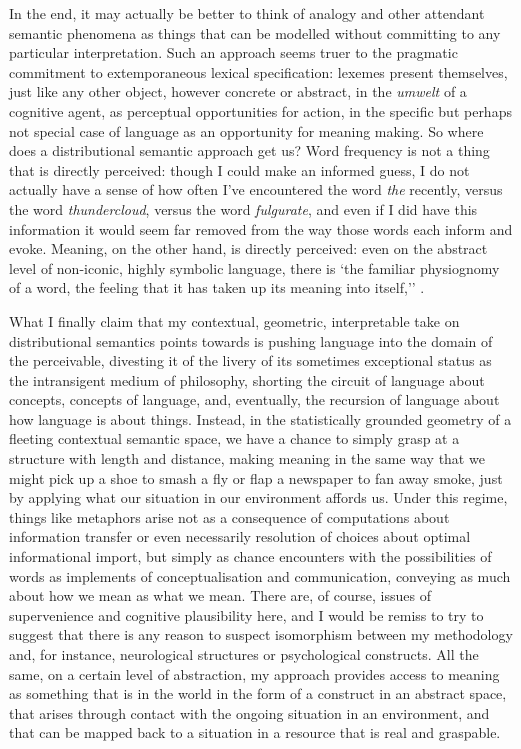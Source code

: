 In the end, it may actually be better to think of analogy and other attendant semantic phenomena as things that can be modelled without committing to any particular interpretation.  Such an approach seems truer to the pragmatic commitment to extemporaneous lexical specification: lexemes present themselves, just like any other object, however concrete or abstract, in the \emph{umwelt} of a cognitive agent, as perceptual opportunities for action, in the specific but perhaps not special case of language as an opportunity for meaning making.  So where does a distributional semantic approach get us?  Word frequency is not a thing that is directly perceived: though I could make an informed guess, I do not actually have a sense of how often I've encountered the word \emph{the} recently, versus the word \emph{thundercloud}, versus the word \emph{fulgurate}, and even if I did have this information it would seem far removed from the way those words each inform and evoke.  Meaning, on the other hand, is directly perceived: even on the abstract level of non-iconic, highly symbolic language, there is `the familiar physiognomy of a word, the feeling that it has taken up its meaning into itself,'' \citep[][p. 218]{Wittgenstein1953}.

What I finally claim that my contextual, geometric, interpretable take on distributional semantics points towards is pushing language into the domain of the perceivable, divesting it of the livery of its sometimes exceptional status as the intransigent medium of philosophy, shorting the circuit of language about concepts, concepts of language, and, eventually, the recursion of language about how language is about things.  Instead, in the statistically grounded geometry of a fleeting contextual semantic space, we have a chance to simply grasp at a structure with length and distance, making meaning in the same way that we might pick up a shoe to smash a fly or flap a newspaper to fan away smoke, just by applying what our situation in our environment affords us.  Under this regime, things like metaphors arise not as a consequence of computations about information transfer or even necessarily resolution of choices about optimal informational import, but simply as chance encounters with the possibilities of words as implements of conceptualisation and communication, conveying as much about how we mean as what we mean.  There are, of course, issues of supervenience and cognitive plausibility here, and I would be remiss to try to suggest that there is any reason to suspect isomorphism between my methodology and, for instance, neurological structures or psychological constructs.  All the same, on a certain level of abstraction, my approach provides access to meaning as something that is in the world in the form of a construct in an abstract space, that arises through contact with the ongoing situation in an environment, and that can be mapped back to a situation in a resource that is real and graspable.

